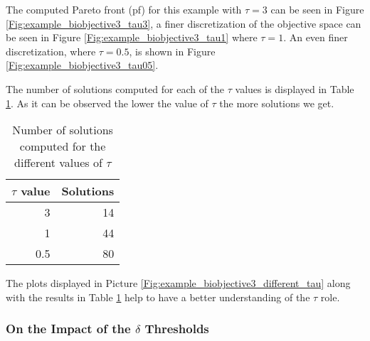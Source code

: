 The computed Pareto front (\gls{pf}) for this example with $\tau = 3$ can be seen in Figure \ref{Fig:example_biobjective3_tau3}, a finer discretization of the objective space can be seen in Figure \ref{Fig:example_biobjective3_tau1} where $\tau = 1$. An even finer discretization, where $\tau = 0.5$, is shown in Figure \ref{Fig:example_biobjective3_tau05}.

\begin{comment}

\begin{figure}[H]
\hspace*{-1cm}
    \subfloat[Computed PF for $\tau = 3$ \label{Fig:example_biobjective3_tau3}]{%
    	\centering \texttt{[image: img/biobjective3\_front\_tau3.png]}
    }
    \subfloat[Computed PF for $\tau = 1$ \label{Fig:example_biobjective3_tau1}]{%
    	\centering \texttt{[image: img/biobjective3\_front\_tau1.png]}
    }
    \subfloat[Computed PF for $\tau = 0.5$ \label{Fig:example_biobjective3_tau05}]{%
    	\centering \texttt{[image: img/biobjective3\_front\_tau05.png]}
    }
    \caption{Pareto fronts computed by the EDS method for different values of $\tau$}
    \label{Fig:example_biobjective3_different_tau}
\end{figure}

\end{comment}

The number of solutions computed for each of the $\tau$ values is displayed in Table \ref{table:sols_per_tau}. As it can be observed the lower the value of $\tau$ the more solutions we get.

\begin{table}[H]
\centering
\begin{tabular}{| r  r |}
	\hline
	$\tau$ value & Solutions\\  
  	\hline
  	3 & 14\\
  	1 & 44\\
  	0.5 & 80\\
  	\hline
\end{tabular}
\caption{Number of solutions computed for the different values of $\tau$}
\label{table:sols_per_tau}
\end{table}

The plots displayed in Picture \ref{Fig:example_biobjective3_different_tau} along with the results in Table \ref{table:sols_per_tau} help to have a better understanding of the $\tau$ role.

\subsubsection{On the Impact of the $\delta$ Thresholds} 

